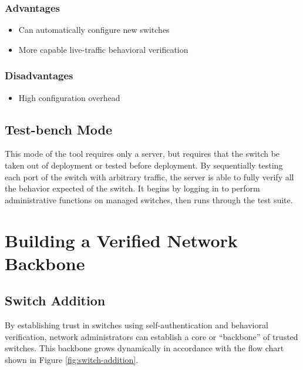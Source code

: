 \documentclass[journal]{IEEEtran}
\begin{document}
\subsubsection{Advantages}
\begin{itemize}
	\item Can automatically configure new switches
	\item More capable live-traffic behavioral verification
\end{itemize}
\subsubsection{Disadvantages}
\begin{itemize}
	\item High configuration overhead
\end{itemize}

\subsection{Test-bench Mode}
This mode of the tool requires only a server, but requires that the switch be taken out of
deployment or tested before deployment. By sequentially testing each port of the switch with
arbitrary traffic, the server is
able to fully verify all the behavior expected of the switch. It begins by logging in to perform
administrative functions on managed switches, then runs through the test suite.



\section{Building a Verified Network Backbone}

\subsection{Switch Addition}
By establishing trust in switches using self-authentication and behavioral verification, network
administrators can establish a core or ``backbone'' of trusted switches. This backbone grows
dynamically in accordance with the flow chart shown in Figure \ref{fig:switch-addition}.
\end{document}

